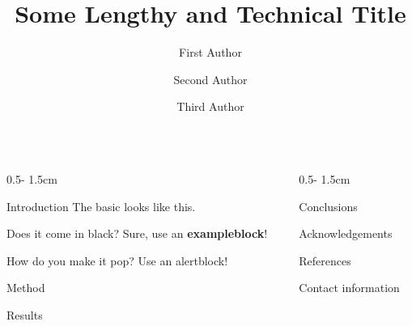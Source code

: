 \documentclass{uioposter}
\title{Some Lengthy and Technical Title}
\author
{%
    First Author\inst{1}
    \and
    Second Author\inst{2}
    \and
    Third Author\inst{1}
}
\institute
{
    \inst{1} Department of Mathematics
    \and
    \inst{2} Department of Informatics
}
\begin{document}
\begin{frame}
\begin{columns}[onlytextwidth]


\begin{column}{0.5\textwidth - 1.5cm}
    \begin{block}{Introduction}
        The basic  looks like this.
    \end{block}

    \begin{exampleblock}{Does it come in black?}
        Sure, use an \textbf{exampleblock}!
    \end{exampleblock}

    \begin{alertblock}{How do you make it pop?}
        Use an \alert{alertblock}!
    \end{alertblock}

    \begin{block}{Method}
        \lipsum[1]
    \end{block}

    \begin{block}{Results}
        \lipsum[2]
        \unskip
    \end{block}
\end{column}


\begin{column}{0.5\textwidth - 1.5cm}
    \begin{block}{Conclusions}
        \lipsum[4]
    \end{block}

    \begin{block}{Acknowledgements}
        \lipsum[5]
    \end{block}

    \begin{block}{References}
        \lipsum[6]
    \end{block}

    \begin{block}{Contact information}
        \lipsum[75]
    \end{block}
\end{column}


\end{columns}
\end{frame}
\end{document}
